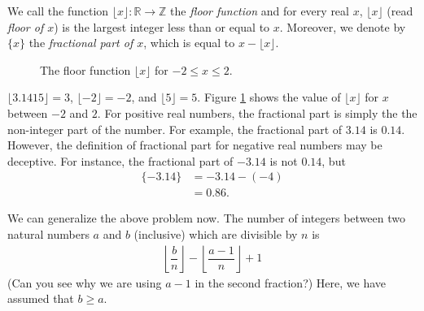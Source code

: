 \documentclass[12pt]{subfile}
\begin{document}
        \begin{definition}
			We call the function $\lfloor x \rfloor: \mathbb{R} \to \mathbb Z$ the \textit{floor function} and for every real $x$, $\lfloor x\rfloor$ (read \textit{floor of $x$}) is the largest integer less than or equal to $x$. Moreover, we denote by $\{x\}$ the \textit{fractional part of $x$}, which is equal to $x-\lfloor x\rfloor$.

			\begin{figure}
				\centering
				\caption{The floor function $\lfloor x \rfloor$ for $-2 \leq x \leq 2$.}
				\label{fig:floorfunction}
			\end{figure}

		\end{definition}

		\begin{example}
			$\lfloor 3.1415\rfloor=3$, $\lfloor-2\rfloor=-2$, and $\lfloor5\rfloor=5$. Figure \ref{fig:floorfunction} shows the value of $\lfloor x \rfloor$ for $x$ between $-2$ and $2$. For positive real numbers, the fractional part is simply the the non-integer part of the number. For example, the fractional part of  $3.14$ is $0.14$. However, the definition of fractional part for negative real numbers may be deceptive. For instance, the fractional part of $-3.14$ is not $0.14$, but
			    \begin{align*}
			        \{-3.14\} &= -3.14 - (-4)\\
			                  &= 0.86.
			    \end{align*}
		\end{example}

	We can generalize the above problem now. The number of integers between two natural numbers $a$ and $b$ (inclusive) which are divisible by $n$ is
		\begin{align*}
		    \left\lfloor\dfrac{b}{n}\right\rfloor-\left\lfloor\dfrac{a-1}{n}\right\rfloor+1
	    \end{align*}
	(Can you see why we are using $a-1$ in the second fraction?) Here, we have assumed that $b\geq a$.
\end{document}
